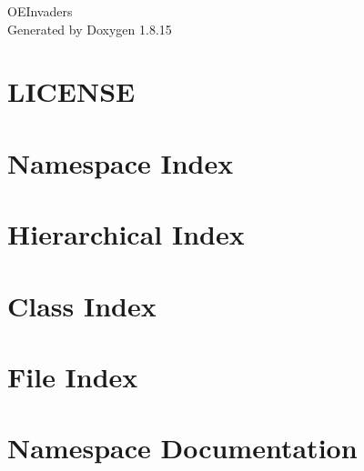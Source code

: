 \let\mypdfximage\pdfximage\def\pdfximage{\immediate\mypdfximage}\documentclass[twoside]{book}
\newcommand{\+}{\discretionary{\mbox{\scriptsize$\hookleftarrow$}}{}{}}
\newcommand{\clearemptydoublepage}{%
  \newpage{\pagestyle{empty}\cleardoublepage}%
}
\begin{document}
\hypersetup{pageanchor=false,
             bookmarksnumbered=true,
             pdfencoding=unicode
            }
\begin{titlepage}
\vspace*{7cm}
\begin{center}%
{\Large O\+E\+Invaders }\\
\vspace*{1cm}
{\large Generated by Doxygen 1.8.15}\\
\end{center}
\end{titlepage}
\clearemptydoublepage
{}
\tableofcontents
\clearemptydoublepage
{}
\hypersetup{pageanchor=true}

\chapter{L\+I\+C\+E\+N\+SE}
\label{md__c_1__users__d__documents__visual__studio_2015__projects__o_e_n_i_k__p_r_o_g4_2019_1__a_s4_d_4e9139b220cda8affb69a46bfef65f30}

\chapter{Namespace Index}

\chapter{Hierarchical Index}

\chapter{Class Index}

\chapter{File Index}

\chapter{Namespace Documentation}





\end{document}
